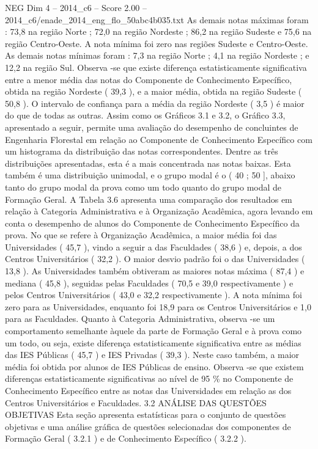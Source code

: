 \begin{textsample}{NEG Dim 4 – 2014\_c6 – Score 2.00 – 2014\_c6/enade\_2014\_eng\_flo\_50abc4b035.txt}
As demais notas máximas foram : 73,8 na região Norte ; 72,0 na região Nordeste ; 86,2 na região Sudeste e 75,6 na região Centro-Oeste.
A nota mínima foi zero nas regiões Sudeste e Centro-Oeste.
As demais notas mínimas foram : 7,3 na região Norte ; 4,1 na região Nordeste ; e 12,2 na região Sul.
Observa -se que existe diferença estatisticamente significativa entre a menor média das notas do Componente de Conhecimento Específico, obtida na região Nordeste ( 39,3 ), e a maior média, obtida na região Sudeste ( 50,8 ).
O intervalo de confiança para a média da região Nordeste ( 3,5 ) é maior do que de todas as outras.
Assim como os Gráficos 3.1 e 3.2, o Gráfico 3.3, apresentado a seguir, permite uma avaliação do desempenho de concluintes de Engenharia Florestal em relação ao Componente de Conhecimento Específico com um histograma da distribuição das notas correspondentes.
Dentre as três distribuições apresentadas, esta é a mais concentrada nas notas baixas.
Esta também é uma distribuição unimodal, e o grupo modal é o ( 40 ; 50 ], abaixo tanto do grupo modal da prova como um todo quanto do grupo modal de Formação Geral.
A Tabela 3.6 apresenta uma comparação dos resultados em relação à Categoria Administrativa e à Organização Acadêmica, agora levando em conta o desempenho de alunos do Componente de Conhecimento Específico da prova.
No que se refere à Organização Acadêmica, a maior média foi das Universidades ( 45,7 ), vindo a seguir a das Faculdades ( 38,6 ) e, depois, a dos Centros Universitários ( 32,2 ).
O maior desvio padrão foi o das Universidades ( 13,8 ).
As Universidades também obtiveram as maiores notas máxima ( 87,4 ) e mediana ( 45,8 ), seguidas pelas Faculdades ( 70,5 e 39,0 respectivamente ) e pelos Centros Universitários ( 43,0 e 32,2 respectivamente ).
A nota mínima foi zero para as Universidades, enquanto foi 18,9 para os Centros Universitários e 1,0 para as Faculdades.
Quanto à Categoria Administrativa, observa -se um comportamento semelhante àquele da parte de Formação Geral e à prova como um todo, ou seja, existe diferença estatisticamente significativa entre as médias das IES Públicas ( 45,7 ) e IES Privadas ( 39,3 ).
Neste caso também, a maior média foi obtida por alunos de IES Públicas de ensino.
Observa -se que existem diferenças estatisticamente significativas ao nível de 95 \% no Componente de Conhecimento Específico entre as notas das Universidades em relação as dos Centros Universitários e Faculdades. 3.2 ANÁLISE DAS QUESTÕES OBJETIVAS Esta seção apresenta estatísticas para o conjunto de questões objetivas e uma análise gráfica de questões selecionadas dos componentes de Formação Geral ( 3.2.1 ) e de Conhecimento Específico ( 3.2.2 ).

\end{textsample}
